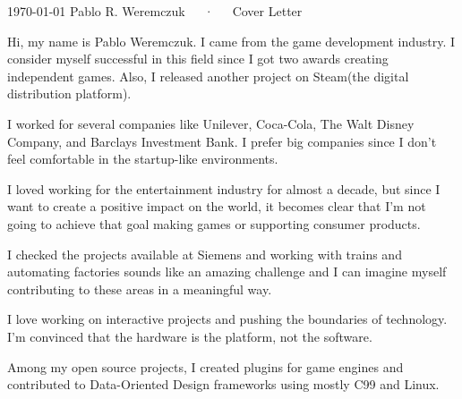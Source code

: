 \documentclass[11pt, a4paper]{awesome-cv}
\begin{document}
\makecvheader

\makecvfooter
  {\today}
  {Pablo R. Weremczuk~~~·~~~Cover Letter}
  {}

\makelettertitle

\begin{cvletter}

Hi, my name is Pablo Weremczuk. I came from the game development industry. I consider myself successful in this field since I got two awards creating independent games. Also, I released another project on Steam(the digital distribution platform).

I worked for several companies like Unilever, Coca-Cola, The Walt Disney Company, and Barclays Investment Bank. I prefer big companies since I don't feel comfortable in the startup-like environments.

I loved working for the entertainment industry for almost a decade, but since I want to create a positive impact on the world, it becomes clear that I'm not going to achieve that goal making games or supporting consumer products.

I checked the projects available at Siemens and working with trains and automating factories sounds like an amazing challenge and I can imagine myself contributing to these areas in a meaningful way.

I love working on interactive projects and pushing the boundaries of technology. I'm convinced that the hardware is the platform, not the software.

Among my open source projects, I created plugins for game engines and contributed to Data-Oriented Design frameworks using mostly C99 and Linux.

\end{cvletter}


\makeletterclosing
\end{document}
